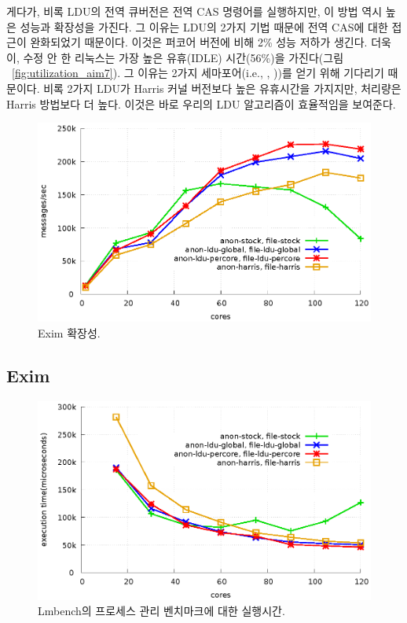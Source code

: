 게다가, 비록 LDU의 전역 큐버전은 전역 CAS 명령어를 실행하지만, 이 방법 역시 높은 성능과 확장성을 가진다.
그 이유는 LDU의 2가지 기법 때문에 전역 CAS에 대한 접근이 완화되었기 때문이다.
이것은 퍼코어 버전에 비해 2\% 성능 저하가 생긴다. 
더욱이, 수정 안 한 리눅스는 가장 높은 유휴(IDLE) 시간(56\%)을 가진다(그림 ~\ref{fig:utilization_aim7}). 
그 이유는 2가지 세마포어(i.e.,
, ))를 얻기 위해 기다리기 때문이다.
비록 2가지 LDU가 Harris 커널 버전보다 높은 유휴시간을 가지지만, 처리량은 Harris 방법보다 더 높다.
이것은 바로 우리의 LDU 알고리즘이 효율적임을 보여준다. 

\begin{figure}[tb]
  \begin{center}
    \includegraphics[scale=1]{graph/exim.eps}
  \end{center}
  \caption{Exim 확장성.}
  \label{fig:exim}
\end{figure}

\subsection{Exim}

\begin{figure}[tb]
  \begin{center}
    \includegraphics[scale=1]{graph/lmbench.eps}
  \end{center}
  \caption{Lmbench의 프로세스 관리 벤치마크에 대한 실행시간.}
  \label{fig:MicroBench}
\end{figure}

